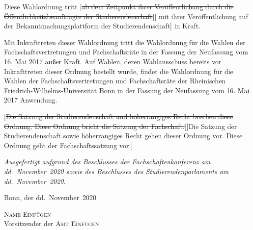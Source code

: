 \documentclass[%
draft,%
multilinesections%
]{fswo}
\newcommand\oldT[1]  {{\color{Gray}[\st{#1}]}}
\newcommand\newT[1]  {{\color{Green}[#1]}}
\newcommand\oldT[1]{}%
\newcommand\newT[1]{#1}
\newcommand\change[2]{\oldT{#1}\newT{#2}}
\begin{document}
\begin{contract}
Diese Wahlordnung tritt \change{ab dem Zeitpunkt ihrer Veröffentlichung durch die Öffentlichkeitsbeauftragte der Studierendenschaft}{%
mit ihrer Veröffentlichung auf der Bekanntmachungsplattform der Studierendenschaft}
in Kraft.

Mit Inkrafttreten dieser Wahlordnung tritt die Wahlordnung für die Wahlen der Fachschaftsvertretungen und Fachschaftsräte in der Fassung der Neufassung vom 16. Mai 2017 außer Kraft.
Auf Wahlen, deren Wahlausschuss bereits vor Inkrafttreten dieser Ordnung bestellt wurde, findet die Wahlordnung für die Wahlen der Fachschaftsvertretungen und Fachschaftsräte der Rheinischen Friedrich-Wilhelms-Universität Bonn in der Fassung der Neufassung vom 16. Mai 2017 Anwendung.

\change{Die Satzung der Studierendenschaft und höherrangiges Recht brechen diese Ordnung.
Diese Ordnung bricht die Satzung der Fachschaft.}{Die Satzung der Studierendenschaft sowie höherrangiges Recht gehen dieser Ordnung vor. Diese Ordnung geht der Fachschaftssatzung vor.}
\end{contract}


\vspace{2em}
{\itshape%
Ausgefertigt aufgrund des Beschlusses der Fachschaftenkonferenz am dd.~November~2020 sowie des Beschlusses des Studierendenparlaments am dd.~November~2020.

Bonn, der dd.~November~2020}
\vspace{1em}
\begin{center}
\textsc{Name Einfügen}\\
Vorsitzender der \textsc{Amt Einfügen}
\end{center}
\end{document}
